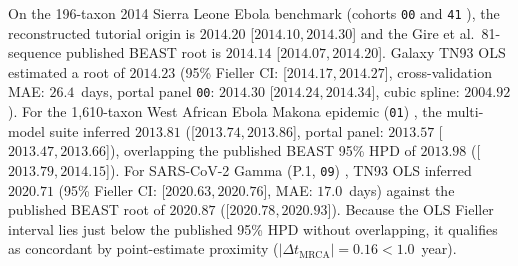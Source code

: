 \documentclass[11pt,letterpaper]{article}
\newcommand{\tool}[1]{\textsf{#1}}
\begin{document}
On the 196-taxon 2014 Sierra Leone Ebola benchmark (cohorts \texttt{00} and \texttt{41} \cite{hill2019skygrid, gire2014genomic}), the reconstructed tutorial origin is $2014.20$ [$2014.10, 2014.30$] and the Gire et al.\ 81-sequence published \tool{BEAST} root is $2014.14$ [$2014.07, 2014.20$]. Galaxy TN93 OLS estimated a root of $2014.23$ (95\% Fieller CI: [$2014.17, 2014.27$], cross-validation MAE: $26.4$~days, portal panel \texttt{00}: $2014.30$ [$2014.24, 2014.34$], cubic spline: $2004.92$). For the 1,610-taxon West African Ebola Makona epidemic (\texttt{01}) \cite{dudas2017virus}, the multi-model suite inferred $2013.81$ ([$2013.74, 2013.86$], portal panel: $2013.57$ [$2013.47, 2013.66$]), overlapping the published \tool{BEAST} 95\% HPD of $2013.98$ ([$2013.79, 2014.15$]). For SARS-CoV-2 Gamma (P.1, \texttt{09}) \cite{faria2021genomics}, TN93 OLS inferred $2020.71$ (95\% Fieller CI: [$2020.63, 2020.76$], MAE: $17.0$~days) against the published \tool{BEAST} root of $2020.87$ ([$2020.78, 2020.93$]). Because the OLS Fieller interval lies just below the published 95\% HPD without overlapping, it qualifies as concordant by point-estimate proximity ($|\Delta t_{\mathrm{MRCA}}| = 0.16 < 1.0$~year).
\end{document}
